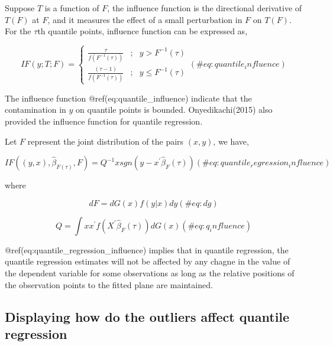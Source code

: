 \documentclass[11pt,a4paper,]{article}
\theoremstyle{definition}
\theoremstyle{definition}
\theoremstyle{remark}
\begin{document}
Suppose \(T\) is a function of \(F\), the influence function is the
directional derivative of \(T(F)\) at \(F\), and it measures the effect
of a small perturbation in \(F\) on \(T(F)\). For the \(\tau\)th
quantile points, influence function can be expressed as,

\begin{equation}

IF(y;T;F)=\left\{
\begin{aligned}
\frac{\tau}{f(F^{-1}(\tau))} & ; & y > F^{-1}(\tau) \\
\frac{(\tau-1)}{f(F^{-1}(\tau))} & ; & y \leq F^{-1}(\tau) 
\end{aligned}
\right.

(\#eq:quantile_influence)
\end{equation}

The influence function @ref(eq:quantile\_influence) indicate that the
contamination in \(y\) on quantile points is bounded. Onyedikachi(2015)
also provided the influence function for quantile regression.

Let \(F\) represent the joint distribution of the pairs \((x,y)\), we
have,

\begin{equation}
IF((y,x),\hat{\beta}_{F(\tau)},F)=Q^{-1}xsgn(y-x^{'}\hat{\beta}_{F}(\tau))
(\#eq:quantile_regression_influence)
\end{equation}

where

\begin{equation}
dF=dG(x)f(y|x)dy
(\#eq: dg)
\end{equation}

\begin{equation}
Q=\int xx^{'}f(X^{'}\hat{\beta}_{F}(\tau))dG(x)
(\#eq: q_influence)
\end{equation}

@ref(eq:quantile\_regression\_influence) implies that in quantile
regression, the quantile regression estimates will not be affected by
any chagne in the value of the dependent variable for some observations
as long as the relative positions of the observation points to the
fitted plane are maintained.

\subsection{Displaying how do the outliers affect quantile
regression}\label{displaying-how-do-the-outliers-affect-quantile-regression}
\end{document}
